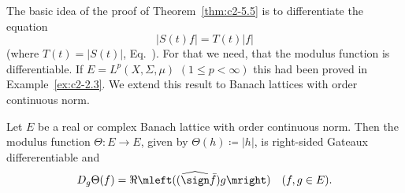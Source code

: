 The basic idea of the proof of Theorem~\ref{thm:c2-5.5}   is to differentiate the equation 
\[
|S(t)f| = T(t)|f|
\]
(where $T(t) = |S(t)|$, \cf Eq.~). For
that we need, that the modulus function is differentiable.
If\/ $E = L^{p}(X,\Sigma,\mu)$ $(1 \leq p < \infty)$ this had been proved in Example~\ref{ex:c2-2.3}.
We extend this result to Banach lattices with order continuous norm.
\begin{proposition}\label{prop:c2-5.6}
Let $E$ be a real or complex Banach lattice with order continuous norm. 
Then the modulus function $\Theta \colon E \to E$, given by $\Theta(h) \coloneq |h|$, is right-sided Gateaux differerentiable and
\begin{equation}\label{eq:c2-5.6}
D_{g}\Theta(f) = \Re\mleft((\widehat{\sign}  \bar{f})g\mright) \quad (f, g \in E).
\end{equation}
\end{proposition}
